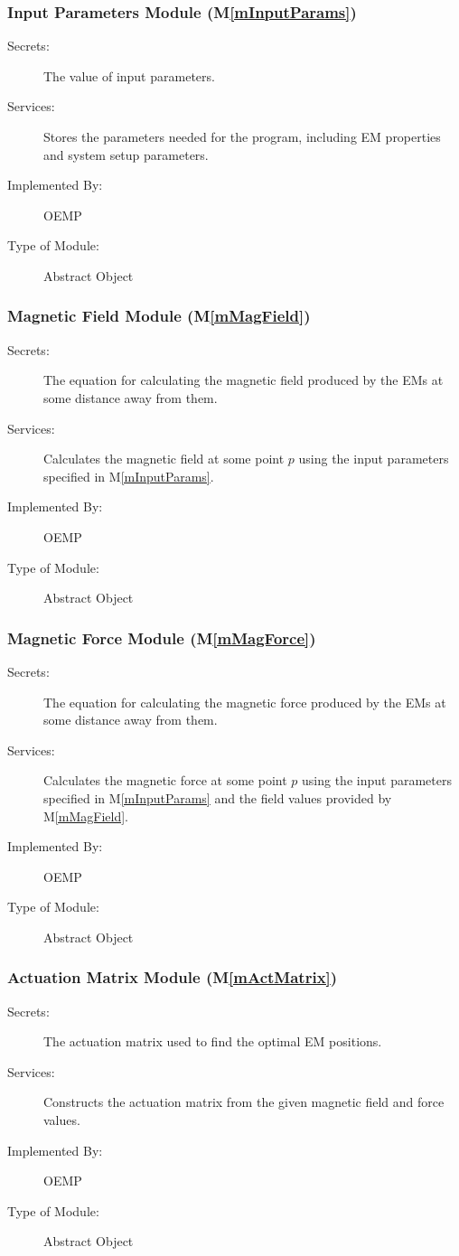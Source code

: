 \documentclass[12pt, titlepage]{article}
\newcommand{\mref}[1]{M\ref{#1}}
\begin{document}
\subsubsection{Input Parameters Module (\mref{mInputParams})}
\begin{description}
  \item[Secrets:]The value of input parameters.
  \item[Services:]Stores the parameters needed for the program, including EM properties and system setup parameters. 
  \item[Implemented By:] OEMP
  \item[Type of Module:] Abstract Object
\end{description}

\subsubsection{Magnetic Field Module (\mref{mMagField})}
\begin{description}
  \item[Secrets:]The equation for calculating the magnetic field produced by the EMs at some distance away from them.
  \item[Services:]Calculates the magnetic field at some point $p$ using the input parameters specified in \mref{mInputParams}. 
  \item[Implemented By:] OEMP
  \item[Type of Module:] Abstract Object
\end{description}

\subsubsection{Magnetic Force Module (\mref{mMagForce})}
\begin{description}
  \item[Secrets:]The equation for calculating the magnetic force produced by the EMs at some distance away from them.
  \item[Services:]Calculates the magnetic force at some point $p$ using the input parameters specified in \mref{mInputParams} and the field values provided by \mref{mMagField}. 
  \item[Implemented By:] OEMP
  \item[Type of Module:] Abstract Object
\end{description}

\subsubsection{Actuation Matrix Module (\mref{mActMatrix})}
\begin{description}
  \item[Secrets:]The actuation matrix used to find the optimal EM positions.
  \item[Services:]Constructs the actuation matrix from the given magnetic field and force values. 
  \item[Implemented By:] OEMP
  \item[Type of Module:] Abstract Object
\end{description}
\end{document}
